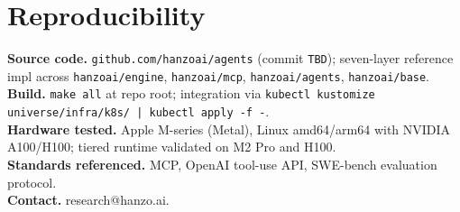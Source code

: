 \documentclass[11pt]{article}
\begin{document}














\section*{Reproducibility}
\textbf{Source code.} \texttt{github.com/hanzoai/agents} (commit \texttt{TBD}); seven-layer reference impl across \texttt{hanzoai/engine}, \texttt{hanzoai/mcp}, \texttt{hanzoai/agents}, \texttt{hanzoai/base}.\\
\textbf{Build.} \texttt{make all} at repo root; integration via \texttt{kubectl kustomize universe/infra/k8s/ | kubectl apply -f -}.\\
\textbf{Hardware tested.} Apple M-series (Metal), Linux amd64/arm64 with NVIDIA A100/H100; tiered runtime validated on M2 Pro and H100.\\
\textbf{Standards referenced.} MCP, OpenAI tool-use API, SWE-bench evaluation protocol.\\
\textbf{Contact.} research@hanzo.ai.
\end{document}
